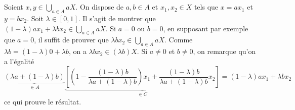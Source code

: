 \documentclass{report}
\begin{document}
\subsection{} \noindent{}\\ 
\\ 
\\
\noindent Soient $x,y\in\bigcup_{a\in A}aX $. On dispose de $a,b\in A$ et $x_1,x_2\in X$ tels que $x=ax_1$ et $y=bx_2$. Soit $\lambda \in [0,1]$. \newline
Il s'agit de montrer que $(1-\lambda)a x_1 + \lambda b x_2\in \bigcup_{a\in A}aX$.\newline
\newline
Si $a=0$ ou $b=0$, en supposant par exemple que $a=0$, il suffit de prouver que $\lambda bx_2 \in \bigcup_{a\in A}aX$. Comme $\lambda b = (1-\lambda)0 +\lambda b$, on a $\lambda bx_2\in (\lambda b) X$.\newline \newline
Si $a\neq 0$ et $b\neq 0$, on remarque qu'on a l'égalité
$$ \underbrace{(\lambda a + (1-\lambda)b)}_{\in A} \underbrace{\left[ \left( 1-\frac{(1-\lambda)b }{\lambda a +(1-\lambda)b }\right)x_1 + \frac{(1-\lambda)b }{\lambda a +(1-\lambda)b }x_2 \right]}_{\in C}=(1-\lambda)a x_1 + \lambda b x_2$$
ce qui prouve le résultat.
\end{document}
